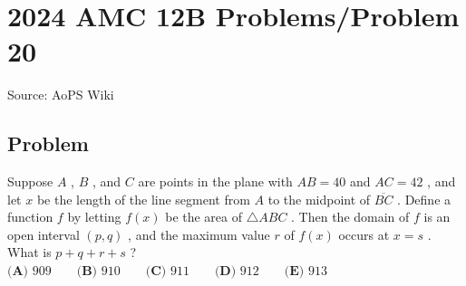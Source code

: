 \documentclass[12pt]{article}
\begin{document}
\section*{{2024 AMC 12B Problems/Problem 20}}
Source: AoPS Wiki

\subsection*{Problem}
Suppose $A$ , $B$ , and $C$ are points in the plane with $AB=40$ and $AC=42$ , and let $x$ be the length of the line segment from $A$ to the midpoint of $\overline{BC}$ . Define a function $f$ by letting $f(x)$ be the area of $\triangle ABC$ . Then the domain of $f$ is an open interval $(p,q)$ , and the maximum value $r$ of $f(x)$ occurs at $x=s$ . What is $p+q+r+s$ ? $\textbf{(A) }909\qquad \textbf{(B) }910\qquad \textbf{(C) }911\qquad \textbf{(D) }912\qquad \textbf{(E) }913\qquad$
\end{document}

